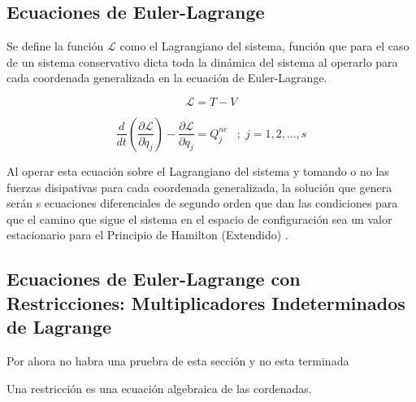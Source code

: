 \documentclass[/home/hernan/Documentos/Apuntes_mecanica_teorica/main.tex]{subfiles}
\begin{document}
    \subsection{Ecuaciones de Euler-Lagrange}

    \begin{definition}
        Se define la función $\mathcal{L}$ como el Lagrangiano del sistema, función que para el caso de un sistema conservativo dicta toda la dinámica del sistema al operarlo para cada coordenada generalizada en la ecuación de Euler-Lagrange.

        \begin{equation}
            \mathcal{L} = T - V
            \label{eq: Lagrangiano}
        \end{equation}
        
    \end{definition}

    \begin{definition} 
        
        \begin{equation}
            \frac{d}{d t} \left(\frac{\partial \mathcal{L} }{\partial \dot{q}_{j}} \right) - \frac{\partial \mathcal{L}}{\partial q_{j}} =  Q_{j}^{nc} \; \; \; ; \; j=1,2,...,s
            \label{eq: eqlagrange}
        \end{equation}

        Al operar esta ecuación sobre el Lagrangiano del sistema y tomando o no las fuerzas disipativas para cada coordenada generalizada, la solución que genera serán s ecuaciones diferenciales de segundo orden que dan las condiciones para que el camino que sigue el sistema en el espacio de configuración sea un valor estacionario para el Principio de Hamilton (Extendido) .
        
    \end{definition}

    \subsection{Ecuaciones de Euler-Lagrange con Restricciones: Multiplicadores Indeterminados de Lagrange}

    Por ahora no habra una pruebra de esta sección y no esta terminada

    \begin{definition}
        Una restricción es una ecuación algebraica de las cordenadas.

        
    \end{definition}
    
\end{document}
